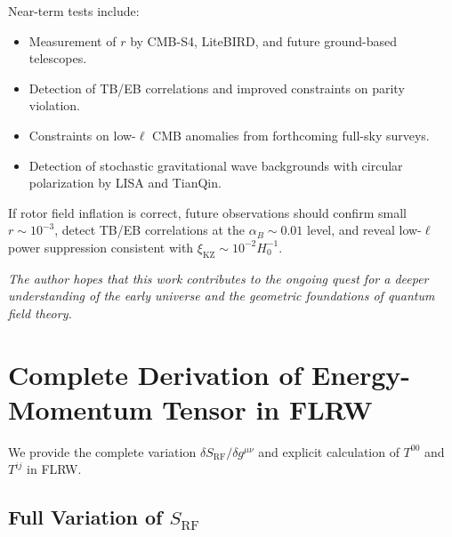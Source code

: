 \documentclass[11pt,a4paper]{article}
\numberwithin{equation}{section}
\theoremstyle{plain}
\theoremstyle{definition}
\theoremstyle{remark}
\newif\ifack
\begin{document}
Near-term tests include:
\begin{itemize}
  \item Measurement of $r$ by CMB-S4, LiteBIRD, and future ground-based telescopes.
  \item Detection of TB/EB correlations and improved constraints on parity violation.
  \item Constraints on low-$\ell$ CMB anomalies from forthcoming full-sky surveys.
  \item Detection of stochastic gravitational wave backgrounds with circular polarization by LISA and TianQin.
\end{itemize}

If rotor field inflation is correct, future observations should confirm small $r \sim 10^{-3}$, detect TB/EB correlations at the $\alpha_B \sim 0.01$ level, and reveal low-$\ell$ power suppression consistent with $\xi_{\mathrm{KZ}} \sim 10^{-2}H_0^{-1}$.

\medskip
\noindent\textit{The author hopes that this work contributes to the ongoing quest for a deeper understanding of the early universe and the geometric foundations of quantum field theory.}

\ifack
\section*{Acknowledgements}
The author is indebted to the pioneering work of David Hestenes, Anthony Lasenby, and Chris Doran in developing geometric algebra as a language for physics. Discussions on inflation with colleagues in the cosmology community were invaluable. Thanks are due to the Planck, BICEP/Keck, and LIGO collaborations for making data publicly available. This work was conducted independently without external funding.
\fi

\appendix

\section{Complete Derivation of Energy-Momentum Tensor in FLRW}
\label{app:stress}

We provide the complete variation $\delta S_{\mathrm{RF}}/\delta g^{\mu\nu}$ and explicit calculation of $T^{00}$ and $T^{ij}$ in FLRW.

\subsection{Full Variation of $S_{\mathrm{RF}}$}
\end{document}
